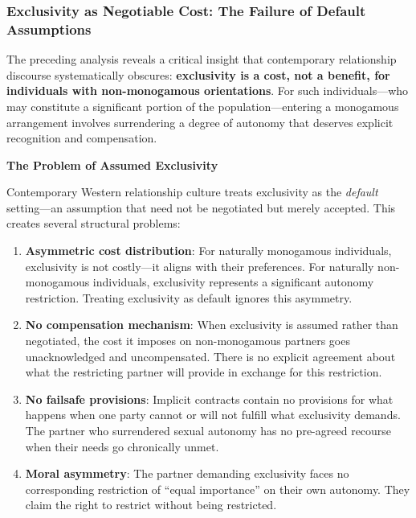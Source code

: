\documentclass[12pt, letterpaper]{article}
\begin{document}
\subsubsection{Exclusivity as Negotiable Cost: The Failure of Default Assumptions}

The preceding analysis reveals a critical insight that contemporary relationship discourse systematically obscures: \textbf{exclusivity is a cost, not a benefit, for individuals with non-monogamous orientations}. For such individuals---who may constitute a significant portion of the population---entering a monogamous arrangement involves surrendering a degree of autonomy that deserves explicit recognition and compensation.

\textbf{The Problem of Assumed Exclusivity}

Contemporary Western relationship culture treats exclusivity as the \textit{default} setting---an assumption that need not be negotiated but merely accepted. This creates several structural problems:

\begin{enumerate}
    \item \textbf{Asymmetric cost distribution}: For naturally monogamous individuals, exclusivity is not costly---it aligns with their preferences. For naturally non-monogamous individuals, exclusivity represents a significant autonomy restriction. Treating exclusivity as default ignores this asymmetry.
    
    \item \textbf{No compensation mechanism}: When exclusivity is assumed rather than negotiated, the cost it imposes on non-monogamous partners goes unacknowledged and uncompensated. There is no explicit agreement about what the restricting partner will provide in exchange for this restriction.
    
    \item \textbf{No failsafe provisions}: Implicit contracts contain no provisions for what happens when one party cannot or will not fulfill what exclusivity demands. The partner who surrendered sexual autonomy has no pre-agreed recourse when their needs go chronically unmet.
    
    \item \textbf{Moral asymmetry}: The partner demanding exclusivity faces no corresponding restriction of ``equal importance'' on their own autonomy. They claim the right to restrict without being restricted.
\end{enumerate}
\end{document}
